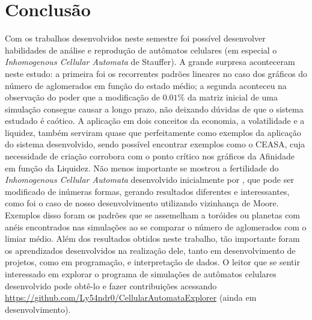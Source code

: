\documentclass[
	12pt,				%
	openright,			%
	twoside,			%
	a4paper,			%
	english,			%
	french,				%
	spanish,			%
	brazil				%
	]{abntex2}
\begin{document}

\chapter{Conclusão}

Com os trabalhos desenvolvidos neste semestre foi possível desenvolver habilidades de análise e reprodução de autômatos celulares (em especial o \textit{Inhomogenous Cellular Automata} de Stauffer). A grande surpresa aconteceram neste estudo: a primeira foi os recorrentes padrões lineares no caso dos gráficos do número de aglomerados em função do estado médio; a segunda aconteceu na observação do poder que a modificação de $0.01\%$ da matriz inicial de uma simulação consegue causar a longo prazo, não deixando dúvidas de que o sistema estudado é caótico. A aplicação em dois conceitos da economia, a volatilidade e a liquidez, também serviram quase que perfeitamente como exemplos da aplicação do sistema desenvolvido, sendo possível encontrar exemplos como o CEASA, cuja necessidade de criação corrobora com o ponto crítico nos gráficos da Afinidade em função da Liquidez. Não menos importante se mostrou a fertilidade do \textit{Inhomogenous Cellular Automata} desenvolvido inicialmente por , que pode ser modificado de inúmeras formas, gerando resultados diferentes e interessantes, como foi o caso de nosso desenvolvimento utilizando vizinhança de Moore. Exemplos disso foram os padrões que se assemelham a toróides ou planetas com anéis encontrados nas simulações ao se comparar o número de aglomerados com o limiar médio. Além dos resultados obtidos neste trabalho, tão importante foram os aprendizados desenvolvidos na realização dele, tanto em desenvolvimento de projetos, como em programação, e interpretação de dados. O leitor que se sentir interessado em explorar o programa de simulações de autômatos celulares desenvolvido pode obtê-lo e fazer contribuições acessando \url{https://github.com/Ly54ndr0/CellularAutomataExplorer} (ainda em desenvolvimento).

\postextual
\end{document}

